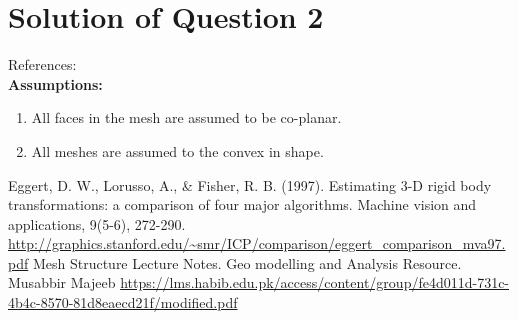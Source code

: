 \documentclass[a4paper, 11pt]{article}
\begin{document}
\section*{Solution of Question 2}
    
References: \cite{Mesh notes}\\
\textbf{Assumptions:}
\begin{enumerate}[label=\alph*.]
    \item
    All faces in the mesh are assumed to be co-planar.
    \item
    All meshes are assumed to the convex in shape.
    
\end{enumerate}

\begin{thebibliography}{1}
Eggert, D. W., Lorusso, A., \& Fisher, R. B. (1997). Estimating 3-D rigid body transformations: a comparison of four major algorithms. Machine vision and applications, 9(5-6), 272-290. \url{http://graphics.stanford.edu/~smr/ICP/comparison/eggert_comparison_mva97.pdf} 
Mesh Structure Lecture Notes. Geo modelling and Analysis Resource. Musabbir Majeeb \url{https://lms.habib.edu.pk/access/content/group/fe4d011d-731c-4b4c-8570-81d8eaecd21f/modified.pdf} 


\end{thebibliography}
\end{document}

